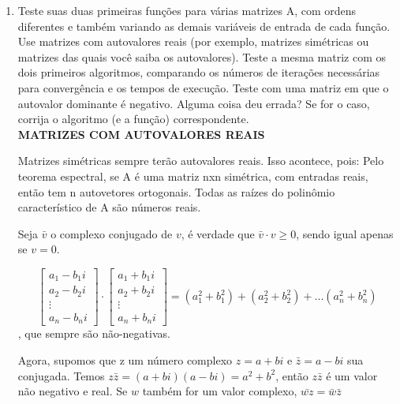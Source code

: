 \documentclass[leqno]{article}
\numberwithin{equation}{section}
\begin{document}
\begin{enumerate}
\begin{sol}
		--------------------------------------------------------------------------------------------------------------------------------------
		\end{sol}
		
		
		\item Teste suas duas primeiras funções para várias matrizes A, com ordens
		diferentes e também variando as demais variáveis de entrada de cada função.
		Use matrizes com autovalores reais (por exemplo, matrizes simétricas ou
		matrizes das quais você saiba os autovalores). Teste a mesma matriz com os
		dois primeiros algoritmos, comparando os números de iterações necessárias
		para convergência e os tempos de execução. Teste com uma matriz em que o
		autovalor dominante é negativo. Alguma coisa deu errada? Se for o caso,
		corrija o algoritmo (e a função) correspondente.\\
		
		\textbf{{\large MATRIZES COM AUTOVALORES REAIS}}
		
		Matrizes simétricas sempre terão autovalores reais. Isso acontece, pois:
		Pelo teorema espectral, se A é uma matriz nxn simétrica, com entradas reais, então tem n autovetores ortogonais.
		Todas as raízes do polinômio característico de A são números reais.
		
		Seja $\bar{v}$ o complexo conjugado de $v$, é verdade que $\bar{v} \cdot v \geq 0$, sendo igual apenas se $v = 0$.
		
		$$\begin{bmatrix}
			a_1 - b_1 i \\
			a_2 - b_2 i \\
			\vdots \\
			a_n - b_n i
		\end{bmatrix} \cdot \begin{bmatrix}
			a_1 + b_1 i \\
			a_2 + b_2 i \\
			\vdots \\
			a_n + b_n i
		\end{bmatrix} = (a_1^2 + b_1^2) + (a_2^2 + b_2^2) + ... (a_n^2 + b_n^2)$$, que sempre são não-negativas.
		
		
		Agora, supomos que z um número complexo $z = a + bi$ e $\bar{z} = a - bi$ sua conjugada. Temos $z\bar{z} = (a + bi)(a - bi) = a^2 + b^2$, então $z\bar{z}$ é um valor não negativo e real. Se $w$ também for um valor complexo, $\bar{wz} = \bar{w}\bar{z}$
			

\end{enumerate}
\end{document}
